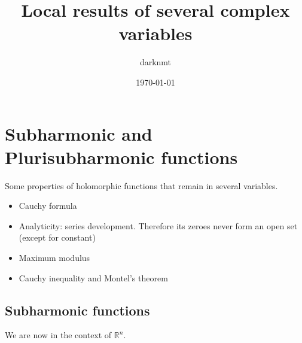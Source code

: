 \documentclass[11pt]{article}
\author{darknmt}
\date{\today}
\title{Local results of several complex variables}
\begin{document}
\maketitle
\tableofcontents

\iffalse
\begin{info}
The PDF version of this page can be downloaded by replacing \texttt{html} in the its address by
\texttt{pdf}. 
For example \texttt{/html/sheaf-cohomology.html} should become \texttt{/pdf/sheaf-cohomology.pdf}.
\end{info}
\fi

\section{Subharmonic and Plurisubharmonic functions}
\label{sec:orgbf45ff7}

Some properties of holomorphic functions that remain in several variables.
\begin{itemize}
\item Cauchy formula
\item Analyticity: series development. Therefore its zeroes never form an open set (except for constant)
\item Maximum modulus
\item Cauchy inequality and Montel's theorem
\end{itemize}


\subsection{Subharmonic functions}
\label{sec:orge070dfc}
We are now in the context of \(\mathbb{R}^n\).
\end{document}
